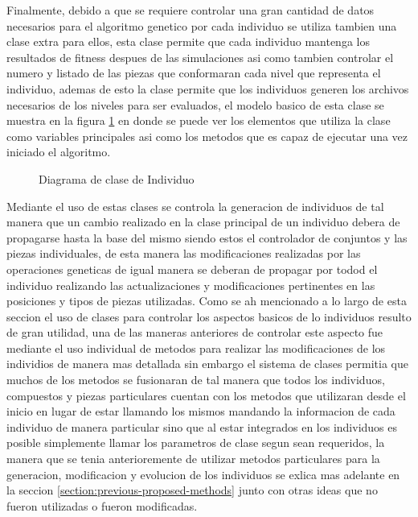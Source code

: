 Finalmente, debido a que se requiere controlar una gran cantidad de datos
necesarios para el algoritmo genetico por cada individuo se utiliza tambien una
clase extra para ellos, esta clase permite que cada individuo mantenga los
resultados de fitness despues de las simulaciones asi como tambien controlar el
numero y listado de las piezas que conformaran cada nivel que representa el
individuo, ademas de esto la clase permite que los individuos generen los
archivos necesarios de los niveles para ser evaluados, el modelo basico de esta
clase se muestra en la figura \ref{figure:composite-class-diagram} en donde se
puede ver los elementos que utiliza la clase como variables principales asi como
los metodos que es capaz de ejecutar una vez iniciado el algoritmo.

\begin{figure}
  \centering
  \scalebox{.65}{}
  \caption{Diagrama de clase de Individuo}
  \label{figure:composite-class-diagram}
\end{figure}

Mediante el uso de estas clases se controla la generacion de individuos de tal
manera que un cambio realizado en la clase principal de un individuo debera de
propagarse hasta la base del mismo siendo estos el controlador de conjuntos y
las piezas individuales, de esta manera las modificaciones realizadas por las
operaciones geneticas de igual manera se deberan de propagar por todod el
individuo realizando las actualizaciones y modificaciones pertinentes en las
posiciones y tipos de piezas utilizadas. Como se ah mencionado a lo largo de
esta seccion el uso de clases para controlar los aspectos basicos de lo
individuos resulto de gran utilidad, una de las maneras anteriores de controlar
este aspecto fue mediante el uso individual de metodos para realizar las
modificaciones de los individios de manera mas detallada sin embargo el sistema
de clases permitia que muchos de los metodos se fusionaran de tal manera que
todos los individuos, compuestos y piezas particulares cuentan con los metodos
que utilizaran desde el inicio en lugar de estar llamando los mismos mandando la
informacion de cada individuo de manera particular sino que al estar integrados
en los individuos es posible simplemente llamar los parametros de clase segun
sean requeridos, la manera que se tenia anterioremente de utilizar metodos
particulares para la generacion, modificacion y evolucion de los individuos se
exlica mas adelante en la seccion \ref{section:previous-proposed-methods} junto
con otras ideas que no fueron utilizadas o fueron modificadas.

